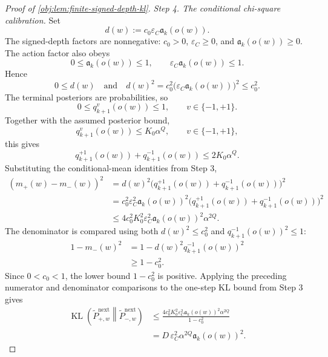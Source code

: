 \begin{proof}[Proof of \cref{obj:lem:finite-signed-depth-kl}]
\emph{Step 4. The conditional chi-square calibration.}
Set
\[
d(w):=c_0\varepsilon_C\mathfrak a_k(o(w)).
\]
The signed-depth factors are nonnegative: \(c_0>0\), \(\varepsilon_C\ge 0\), and \(\mathfrak a_k(o(w))\ge 0\).  The action factor also obeys
\[
0\le \mathfrak a_k(o(w))\le 1,
\qquad
\varepsilon_C\mathfrak a_k(o(w))\le 1.
\]
Hence
\[
0\le d(w)
\quad\text{and}\quad
 d(w)^2
=c_0^2\bigl(\varepsilon_C\mathfrak a_k(o(w))\bigr)^2
\le c_0^2.
\]
The terminal posteriors are probabilities, so
\[
0\le q_{k+1}^{v}(o(w))\le 1,
\qquad v\in\{-1,+1\}.
\]
Together with the assumed posterior bound,
\[
q_{k+1}^{v}(o(w))\le K_0\alpha^Q,
\qquad v\in\{-1,+1\},
\]
this gives
\[
q_{k+1}^{+1}(o(w))+q_{k+1}^{-1}(o(w))
\le 2K_0\alpha^Q.
\]
Substituting the conditional-mean identities from Step 3,
\[
\begin{aligned}
(m_+(w)-m_-(w))^2
&=d(w)^2\bigl(q_{k+1}^{+1}(o(w))+q_{k+1}^{-1}(o(w))\bigr)^2  \\
&=c_0^2\varepsilon_C^2\mathfrak a_k(o(w))^2
\bigl(q_{k+1}^{+1}(o(w))+q_{k+1}^{-1}(o(w))\bigr)^2 \\
&\le
4c_0^2K_0^2\varepsilon_C^2\mathfrak a_k(o(w))^2\alpha^{2Q}.
\end{aligned}
\]
The denominator is compared using both \(d(w)^2\le c_0^2\) and \(q_{k+1}^{-1}(o(w))^2\le 1\):
\[
\begin{aligned}
1-m_-(w)^2
&=1-d(w)^2q_{k+1}^{-1}(o(w))^2 \\
&\ge 1-c_0^2.
\end{aligned}
\]
Since \(0<c_0<1\), the lower bound \(1-c_0^2\) is positive.  Applying the preceding numerator and denominator comparisons to the one-step KL bound from Step 3 gives
\[
\begin{aligned}
\operatorname{KL}\!\left(\widetilde P_{+,w}^{\mathrm{next}}\middle\|\widetilde P_{-,w}^{\mathrm{next}}\right)
&\le
\frac{4c_0^2K_0^2\varepsilon_C^2\mathfrak a_k(o(w))^2\alpha^{2Q}}{1-c_0^2} \\
&=
D\,\varepsilon_C^2\alpha^{2Q}\mathfrak a_k(o(w))^2 .
\end{aligned}
\] %


\end{proof}
